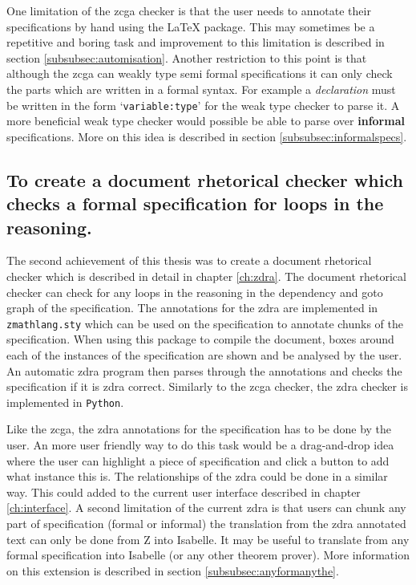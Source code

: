 One limitation of the \gls{zcga} checker is that the user needs to annotate
their specifications by hand using the \LaTeX{} package. This may sometimes be a
repetitive and boring task and improvement to this limitation is described in
section \ref{subsubsec:automisation}. Another restriction to this point is that
although the \gls{zcga} can weakly type semi formal specifications it can only
check the parts which are written in a formal syntax. For example a
\textit{declaration} must be written in the form `\texttt{variable:type}' for
the weak type checker to parse it. A more beneficial weak type checker would
possible be able to parse over \textbf{informal} specifications. More on this
idea is described in section \ref{subsubsec:informalspecs}.

\subsection{To create a document rhetorical checker which checks a formal specification for loops in the reasoning.}

The second achievement of this thesis was to create a document rhetorical
checker which is described in detail in chapter \ref{ch:zdra}. The document
rhetorical checker can check for any loops in the reasoning in the dependency
and goto graph of the specification. The annotations for the \gls{zdra} are
implemented in \texttt{zmathlang.sty} which can be used on the specification to
annotate chunks of the specification. When using this package to compile the
document, boxes around each of the instances of the specification are shown and
be analysed by the user. An automatic \gls{zdra} program then parses through the
annotations and checks the specification if it is \gls{zdra} correct. Similarly
to the \gls{zcga} checker, the \gls{zdra} checker is implemented in
\texttt{Python}.

Like the \gls{zcga}, the \gls{zdra} annotations for the specification has to be
done by the user. An more user friendly way to do this task would be a
drag-and-drop idea where the user can highlight a piece of specification and
click a button to add what instance this is. The relationships of the \gls{zdra}
could be done in a similar way. This could added to the current user interface
described in chapter \ref{ch:interface}. A second limitation of the current
\gls{zdra} is that users can chunk any part of specification (formal or
informal) the translation from the \gls{zdra} annotated text can only be done
from Z into Isabelle. It may be useful to translate from any formal
specification into Isabelle (or any other theorem prover). More information on
this extension is described in section \ref{subsubsec:anyformanythe}.


